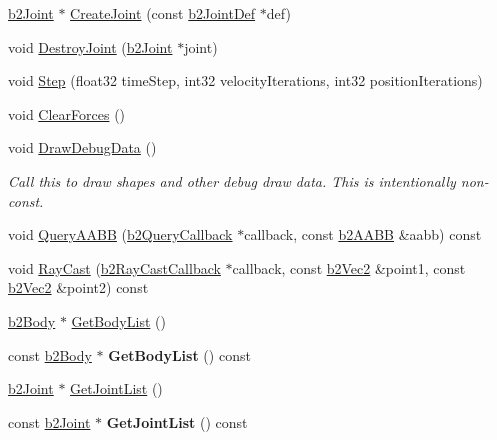 \begin{DoxyCompactItemize}
\hyperlink{classb2Joint}{b2\+Joint} $\ast$ \hyperlink{classb2World_a5cba9d0653149eb62504154e6fb35021}{Create\+Joint} (const \hyperlink{structb2JointDef}{b2\+Joint\+Def} $\ast$def)
\item 
void \hyperlink{classb2World_add5942aef171e54cfa384c8975746dca}{Destroy\+Joint} (\hyperlink{classb2Joint}{b2\+Joint} $\ast$joint)
\item 
void \hyperlink{classb2World_a7a8eff61af98461f978fe43f3af7be90}{Step} (float32 time\+Step, int32 velocity\+Iterations, int32 position\+Iterations)
\item 
void \hyperlink{classb2World_ac082ab4c4ad0b1c5ec4674315eeec643}{Clear\+Forces} ()
\item 
\mbox{\label{classb2World_a293d9865e407fd463e168b0a29856acc}} 
void \hyperlink{classb2World_a293d9865e407fd463e168b0a29856acc}{Draw\+Debug\+Data} ()
\begin{DoxyCompactList}\small\item\em Call this to draw shapes and other debug draw data. This is intentionally non-\/const. \end{DoxyCompactList}\item 
void \hyperlink{classb2World_ad169fae775be1e1f16386f7587786fa8}{Query\+A\+A\+BB} (\hyperlink{classb2QueryCallback}{b2\+Query\+Callback} $\ast$callback, const \hyperlink{structb2AABB}{b2\+A\+A\+BB} \&aabb) const
\item 
void \hyperlink{classb2World_aa9955d94a254253997daaf16ce77bab6}{Ray\+Cast} (\hyperlink{classb2RayCastCallback}{b2\+Ray\+Cast\+Callback} $\ast$callback, const \hyperlink{structb2Vec2}{b2\+Vec2} \&point1, const \hyperlink{structb2Vec2}{b2\+Vec2} \&point2) const
\item 
\hyperlink{classb2Body}{b2\+Body} $\ast$ \hyperlink{classb2World_a1b87c03955e3312d308ddf679adf3c85}{Get\+Body\+List} ()
\item 
\mbox{\label{classb2World_a8afde497a719bb1507fdfb474e79881a}} 
const \hyperlink{classb2Body}{b2\+Body} $\ast$ {\bfseries Get\+Body\+List} () const
\item 
\hyperlink{classb2Joint}{b2\+Joint} $\ast$ \hyperlink{classb2World_a55db7240f8290aa02cab79f181934de8}{Get\+Joint\+List} ()
\item 
\mbox{\label{classb2World_af5f7feca7396ce10b905966a464177aa}} 
const \hyperlink{classb2Joint}{b2\+Joint} $\ast$ {\bfseries Get\+Joint\+List} () const

\end{DoxyCompactItemize}
